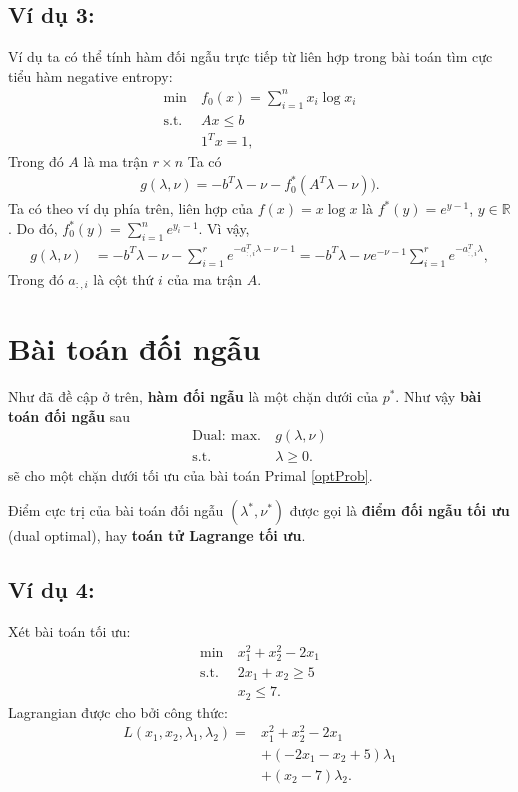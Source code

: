 \documentclass{book}
\begin{document}
\subsection*{Ví dụ 3:}
Ví dụ ta có thể tính hàm đối ngẫu trực tiếp từ liên hợp trong bài toán tìm cực tiểu hàm negative entropy:
\begin{align*}
\mathrm{min~} & f_0(x) = \sum_{i = 1}^n x_i \log x_i \\
\mathrm{s.t.~} & Ax \leq b \\
			& 1^T x = 1,
\end{align*}
Trong đó $A$ là ma trận $r \times n$
Ta có
\begin{align*}
g(\lambda, \nu) = -b^T\lambda - \nu - f^*_0(A^T \lambda - \nu)).
\end{align*}
Ta có theo ví dụ phía trên, liên hợp của $f(x) = x\log x$ là $f^*(y) = e^{y-1}$, $y \in \mathbb{R}$.
Do đó, $f_0^*(y) = \sum_{i=1}^n e^{y_i - 1}$. Vì vậy,
\begin{align*}
g(\lambda, \nu)	&= -b^T\lambda -  \nu - \sum_{i = 1}^r  e^{-a_{:,i}^T \lambda - \nu - 1} = -b^T\lambda -  \nu e^{- \nu - 1}\sum_{i = 1}^r e^{-a_{:,i}^T \lambda},
\end{align*}
Trong đó $a_{:,i}$ là cột thứ $i$ của ma trận $A$.



\section{Bài toán đối ngẫu}
Như đã đề cập ở trên, \textbf{hàm đối ngẫu} là một chặn dưới của $p^*$. 
Như vậy \textbf{bài toán đối ngẫu} sau 
\begin{align*}
\mathrm{Dual: ~max.} ~& g(\lambda, \nu) \\
\mathrm{s.t.~} & \lambda \geq 0.
\end{align*}
sẽ cho một chặn dưới tối ưu của bài toán Primal \eqref{optProb}.

Điểm cực trị của bài toán đối ngẫu $(\lambda^*, \nu^*)$ được gọi là \textbf{điểm đối ngẫu tối ưu} (dual optimal), hay \textbf{toán tử Lagrange tối ưu}.

\subsection*{Ví dụ 4:}
Xét bài toán tối ưu:
\begin{align}
\mathrm{min~} & x_1^2 + x_2^2 - 2x_1 \label{eq:ex1_lp}\\
\mathrm{s.t.~} & 2x_1 + x_2 \geq 5 \nonumber\\
			& x_2 \leq 7. \nonumber
\end{align}
Lagrangian được cho bởi công thức:
\begin{align*}
L(x_1, x_2, \lambda_1, \lambda_2) = & x_1^2 + x_2^2 - 2 x_1  \\
								& + (-2x_1 - x_2 + 5)\lambda_1 \\
								& + (x_2 - 7) \lambda_2.
\end{align*}
\end{document}
